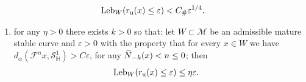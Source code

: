 \documentclass[10pt]{amsart}
\theoremstyle{definition}\newtheorem{defi}[theo]{Definition}\newtheorem{rema}[theo]{Remark}\newtheorem{exam}[theo]{Example}\newtheorem{exem}[theo]{Example}\newtheorem{nota}[theo]{Notation}
\newcommand{\eps}{\varepsilon}
\newcommand{\unstable}{\text{u}}
\newcommand{\homo}{\mathbb{H}}
\newcommand{\cm}{\mathcal{F}}
\newcommand{\csp}{\mathcal{M}}
\newcommand{\ru}{r_{\unstable}}
\newcommand{\singPrivate}{\mathcal{S}}
\newcommand{\hsing}[1]{{\singPrivate}_\homo^{#1}}
\newcommand{\admiss}{admissible}
\newcommand{\Np}{\hat N}
\newcommand{\Leb}{\textup{Leb}}
\newcommand{\Const}{C_\#}
\newcommand*{\relabel}{\renewcommand{\labelenumi}{(\theenumi)}}
\newcommand*{\alphenumi}{\renewcommand*{\theenumi}{\alph{enumi}}\relabel}
\let\oldhat\hat
\renewcommand*{\hat}[1]{\mathchoice{\widehat{#1}}{\widehat{#1}}{\oldhat{#1}}{\oldhat{#1}}}
\begin{document}
\begin{coro}
\begin{enumerate}
\begin{align*}
\Leb_{W}(\ru(x)\le\eps) < \Const \eps^{1/4}.
\end{align*}
\end{enumerate}
\begin{enumerate}\alphenumi
\setcounter{enumi}{3}
\item \label{coro7.10.d} for any $\eta > 0$ there exists $k > 0$ so that: let $W\subset\csp$ be an \admiss{} mature stable curve and $\eps > 0$ with the property that for every $x\in W$ we have $d_{\alpha}(\cm^{n}x,\hsing{1}) > C \eps$, for any $\Np_{-k}(x) < n \le 0$; then
\begin{align*}
\Leb_W(\ru(x)\leq \eps)&\leq\eta \eps.
\end{align*}
\end{enumerate}
\end{coro}
\end{document}

